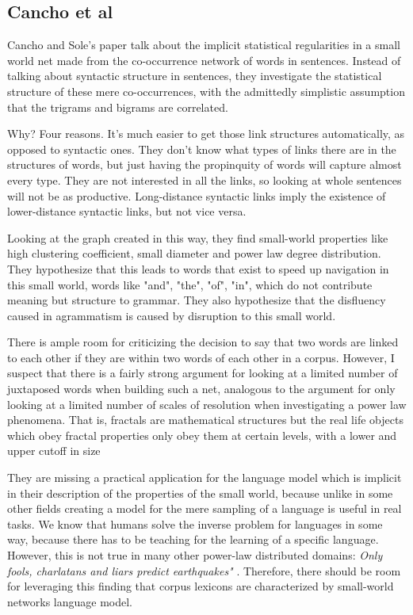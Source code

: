 \documentclass[12pt]{article}
\begin{document}
\subsection{Cancho et al}

Cancho and Sole's paper talk about the implicit statistical regularities in a small world net made from the co-occurrence network of words in sentences. Instead of talking about syntactic structure in sentences, they investigate the statistical structure of these mere co-occurrences, with the admittedly simplistic assumption that the trigrams and bigrams are correlated.

Why? Four reasons. It's much easier to get those link structures automatically, as opposed to syntactic ones. They don't know what types of links there are in the structures of words, but just having the propinquity of words will capture almost every type. They are not interested in all the links, so looking at whole sentences will not be as productive. Long-distance syntactic links imply the existence of lower-distance syntactic links, but not vice versa.

Looking at the graph created in this way, they find small-world properties like high clustering coefficient, small diameter and power law degree distribution. They hypothesize that this leads to words that exist to speed up navigation in this small world, words like "and", "the", "of", "in", which do not contribute meaning but structure to grammar. They also hypothesize that the disfluency caused in agrammatism is caused by disruption to this small world.

There is ample room for criticizing the decision to say that two words are linked to each other if they are within two words of each other in a corpus. However, I suspect that there is a fairly strong argument for looking at a limited number of juxtaposed words when building such a net, analogous to the argument for only looking at a limited number of scales of resolution when investigating a power law phenomena. That is, fractals are mathematical structures but the real life objects which obey fractal properties only obey them at certain levels, with a lower and upper cutoff in size \cite{fractalcutoffs}

They are missing a practical application for the language model which is implicit in their description of the properties of the small world, because unlike in some other fields creating a model for the mere sampling of a language is useful in real tasks. We know that humans solve the inverse problem for languages in some way, because there has to be teaching for the learning of a specific language. However, this is not true in many other power-law distributed domains: \emph{Only fools, charlatans and liars predict earthquakes"} \cite{richter}. Therefore, there should be room for leveraging this finding that corpus lexicons are characterized by small-world networks language model.
\end{document}
